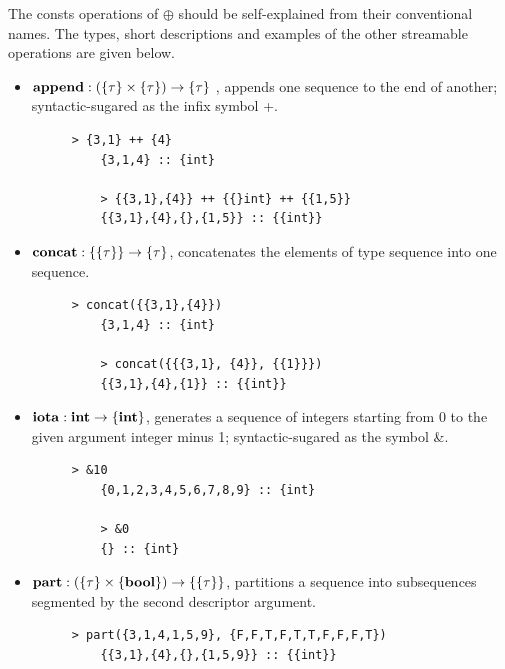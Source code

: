 The consts operations of $\oplus$ should be self-explained from their conventional names. 
The types, short descriptions and examples of the other streamable operations are given below.

\begin{itemize}

	\item $\mathbf{append : (\{\tau\} \times \{\tau\}) \rightarrow \{\tau\}}$ , 
	appends one sequence to the end of another; syntactic-sugared as the infix symbol {\++}.

	\begin{figure}[H]
	\begin{example}
	\end{example}
	\begin{lstlisting}[style = nesl-style]
	> {3,1} ++ {4}
	{3,1,4} :: {int}
	
	> {{3,1},{4}} ++ {{}int} ++ {{1,5}}
	{{3,1},{4},{},{1,5}} :: {{int}}
	\end{lstlisting}
	\end{figure}


	\item $\mathbf{concat: \{\{\tau\}\} \rightarrow \{\tau\} }$, concatenates the elements of type sequence into one sequence. 
	\begin{figure}[H]
	\begin{example}
	\end{example}
	\begin{lstlisting}[style = nesl-style]
	> concat({{3,1},{4}})
	{3,1,4} :: {int}
	
	> concat({{{3,1}, {4}}, {{1}}})
	{{3,1},{4},{1}} :: {{int}}
	\end{lstlisting}
	\end{figure}

	\item $\mathbf{iota: \mathbf{int} \rightarrow \{\mathbf{int}\}}$, generates a sequence of integers starting from 0 to the given argument integer minus 1; syntactic-sugared as the symbol \&. 
	\begin{figure}[H]
	\begin{example}
	\end{example}
	\begin{lstlisting}[style = nesl-style]
	> &10
	{0,1,2,3,4,5,6,7,8,9} :: {int}
	
	> &0
	{} :: {int}
	\end{lstlisting}
	\end{figure}
	
	\item $\mathbf{part: (\{\tau\} \times \{\mathbf{bool}\}) \rightarrow  \{\{\tau\}\}}$,  partitions a sequence into subsequences segmented by the second descriptor argument. 
	\begin{figure}[H]
	\begin{example}
	\end{example}
	\begin{lstlisting}[style = nesl-style]
	> part({3,1,4,1,5,9}, {F,F,T,F,T,T,F,F,F,T})
	{{3,1},{4},{},{1,5,9}} :: {{int}}
	

\end{lstlisting}
\end{figure}
\end{itemize}
